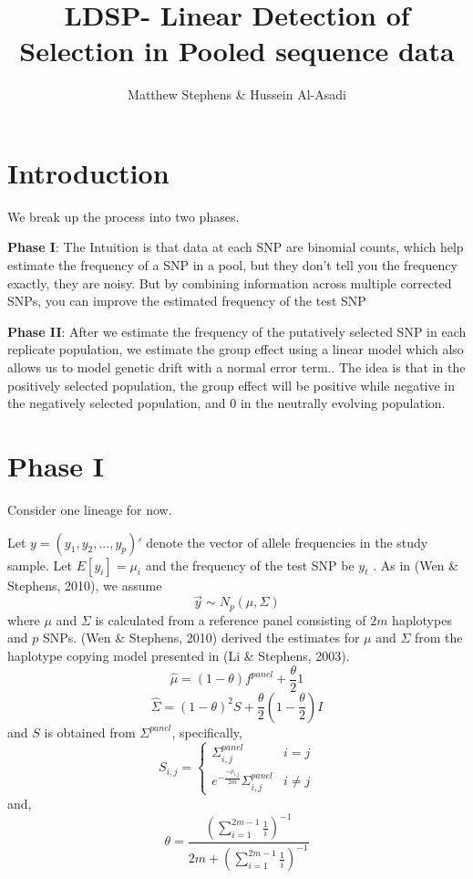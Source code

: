 \documentclass[10pt,a4paper,draft]{article}
\title{LDSP- Linear Detection of Selection in Pooled sequence data}
\date{}
\author{Matthew Stephens \& Hussein Al-Asadi}
\begin{document}
\maketitle
\section{Introduction}
We break up the process into two phases.

\textbf{Phase I}:
The Intuition is that data at each SNP are binomial counts, which help estimate the frequency of a SNP in a pool, but they don't
tell you the frequency exactly, they are noisy. But by combining information across multiple corrected SNPs, you can improve the estimated frequency of the test SNP

\textbf{Phase II}:
After we estimate the frequency of the putatively selected SNP in each replicate population, we estimate the group effect using a linear model which also allows us to model genetic drift with a normal error term.. The idea is that in the positively selected population, the group effect will be positive while negative in the negatively selected population, and 0 in the neutrally evolving population.

\section{Phase I}
Consider one lineage for now.

Let  $y = (y_1, y_2, ..., y_p)'$ denote the vector of allele frequencies in the study sample.
Let $E[y_{i}] = \mu_{i}$ and the frequency of the test SNP be $y_{t}$ . As in (Wen \& Stephens, 2010), we assume 
\begin{equation}
\vec{y} \sim N_p(\mu, \Sigma) \label{eq:prior}
\end{equation}
where $\mu$ and $\Sigma$ is calculated from a reference panel consisting of $2m$ haplotypes and $p$ SNPs. (Wen \& Stephens, 2010) derived the estimates for $\mu$ and $\Sigma$ from the haplotype copying model presented in (Li \& Stephens, 2003).
\begin{equation}
\hat{\mu} = (1-\theta)f^{panel} + \frac{\theta}{2}1 
\end{equation}
\begin{equation}
\hat{\Sigma} = (1-\theta)^2S + \frac{\theta}{2}(1-\frac{\theta}{2})I
\end{equation}
and $S$ is obtained from $\Sigma^{panel}$, specifically,
 \begin{equation}
   S_{i,j} = \left\{
     \begin{array}{lr}
       \Sigma_{i,j}^{panel} &  i =j\\
       e^{-\frac{-\rho_{i,j}}{2m}} \Sigma_{i,j}^{panel} &  i \neq j
     \end{array}
   \right.
\end{equation} 
and,
\begin{equation}
\theta = \frac{(\sum_{i=1}^{2m-1} \frac{1}{i})^{-1}}{2m + (\sum_{i=1}^{2m-1} \frac{1}{i})^{-1}}
\end{equation}
\end{document}
